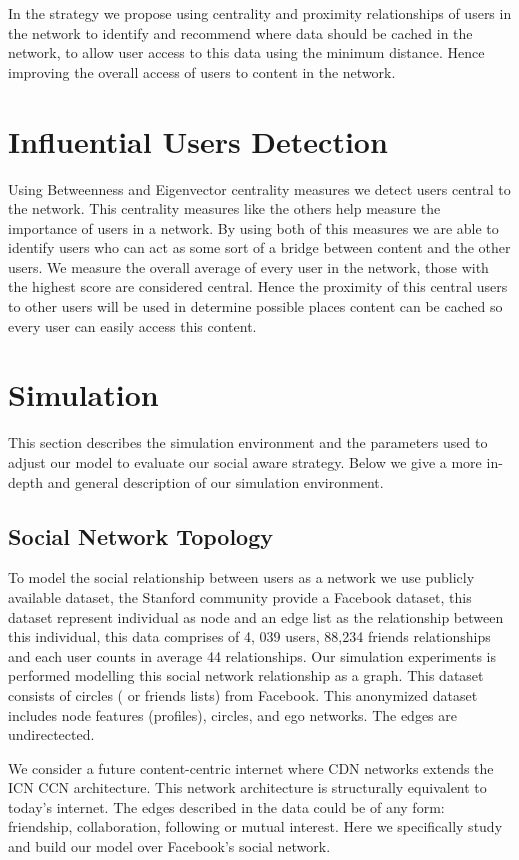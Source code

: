 In the strategy we propose using centrality and proximity relationships of users in the network to identify and recommend where data should be cached in the network, to allow user access to this data using the minimum distance. Hence improving the overall access of users to content in the network. 


\section{Influential Users Detection}
Using Betweenness and Eigenvector centrality measures we detect users central to the network. This centrality measures like the others help measure the importance of users in a network. By using both of this measures we are able to identify users who can act as some sort of a bridge between content and the other users. We measure the overall average of every user in the network, those with the highest score are considered central. 
Hence the proximity of this central users to other users will be used in determine possible places content can be cached so every user can easily access this content.


\section{Simulation}

This section describes the simulation environment and the parameters used to adjust our model to evaluate our social aware strategy. Below we give a more in-depth and general description of our simulation environment. 

\subsection{Social Network Topology}
To model the social relationship between users as a network we use publicly available dataset, the Stanford community provide a Facebook dataset, this dataset represent individual as node and an edge list as the relationship between this individual, this data comprises of 4, 039 users, 88,234 friends relationships and each user counts in average 44 relationships. Our simulation experiments is performed modelling this social network relationship as a graph.  This dataset consists of circles ( or friends lists) from Facebook. This anonymized dataset includes node features (profiles), circles, and ego networks. The edges are undirectected.

We consider a future content-centric internet where CDN networks extends the ICN CCN architecture. This network architecture is structurally equivalent to today’s internet. The edges described in the data could be of any form: friendship, collaboration, following or mutual interest. Here we specifically study and build our model over Facebook’s social network.



